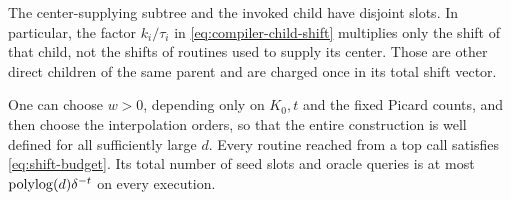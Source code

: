 The center-supplying subtree and the invoked child have disjoint
slots.  In particular, the factor $k_i/\tau_i$ in
\eqref{eq:compiler-child-shift} multiplies only the shift of that
child, not the shifts of routines used to supply its center.  Those
are other direct children of the same parent and are charged once
in its total shift vector.

\begin{lemma}
\label{lem:compiler-count}
One can choose $w>0$, depending only on $K_0,t$ and the fixed Picard
counts, and then choose the interpolation orders, so that the entire
construction is well defined for all sufficiently large $d$.
Every routine reached from a top call satisfies
\eqref{eq:shift-budget}.  Its total number of seed slots and oracle
queries is at most $\operatorname{polylog}(d)\delta^{-t}$ on every execution.
\end{lemma}
